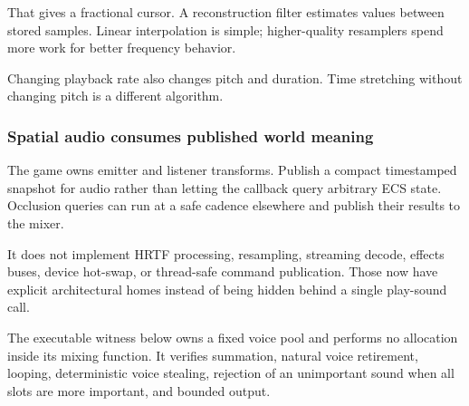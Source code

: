 That gives a fractional cursor. A reconstruction filter estimates values between stored samples. Linear interpolation is simple; higher-quality resamplers spend more work for better frequency behavior.

Changing playback rate also changes pitch and duration. Time stretching without changing pitch is a different algorithm.

\subsubsection{Spatial audio consumes published world meaning}\label{05-engine-i-ch009-spatial-audio-consumes-published-world-meaning}

\hypertarget{05-engine-i-ch009-spatial-audio-consumes-published-world-meaning}{}

The game owns emitter and listener transforms. Publish a compact timestamped snapshot for audio rather than letting the callback query arbitrary ECS state. Occlusion queries can run at a safe cadence elsewhere and publish their results to the mixer.

It does not implement HRTF processing, resampling, streaming decode, effects buses, device hot-swap, or thread-safe command publication. Those now have explicit architectural homes instead of being hidden behind a single play-sound call.

The executable witness below owns a fixed voice pool and performs no allocation inside its mixing function. It verifies summation, natural voice retirement, looping, deterministic voice stealing, rejection of an unimportant sound when all slots are more important, and bounded output.

